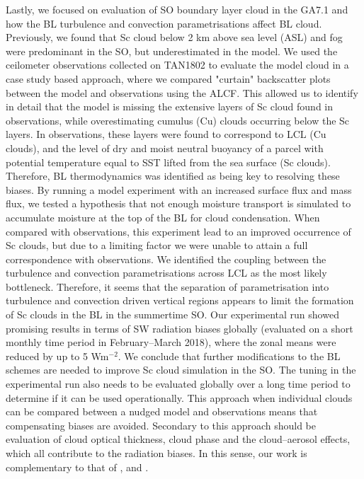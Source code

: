 Lastly, we focused on evaluation of SO boundary layer cloud in the GA7.1
and how the BL turbulence and convection parametrisations affect
BL cloud. Previously, we found that Sc cloud below 2 km above sea level (ASL)
and fog were predominant in the SO, but underestimated in the model. We used
the ceilometer observations collected on TAN1802 to evaluate the model cloud
in a case study based approach, where we compared "curtain" backscatter plots
between the model and observations using the ALCF. This allowed us to identify
in detail that the model is missing the extensive layers of Sc cloud found
in observations, while overestimating cumulus (Cu) clouds occurring below the
Sc layers. In observations, these layers were found to correspond to LCL (Cu clouds),
and the level of dry and moist neutral buoyancy of a parcel with potential temperature
equal to SST lifted from the sea surface (Sc clouds). Therefore, BL
thermodynamics was identified as being key to resolving these biases. By running
a model experiment with an increased surface flux and mass flux, we tested
a hypothesis that not enough moisture transport is simulated to accumulate
moisture at the top of the BL for cloud condensation. When compared with
observations, this experiment lead to an improved occurrence of Sc clouds,
but due to a limiting factor we were unable to attain a full correspondence
with observations. We identified the coupling between the turbulence and convection
parametrisations across LCL as the most likely bottleneck. Therefore, it seems
that the separation of parametrisation into turbulence and convection driven
vertical regions appears to limit the formation of Sc clouds in the BL in the
summertime SO. Our experimental run showed promising results in terms of
SW radiation biases globally (evaluated on a short monthly time period in February--March 2018),
where the zonal means were reduced by up to 5 Wm$^{-2}$. We conclude that
further modifications to the BL schemes are needed to improve
Sc cloud simulation in the SO. The tuning in the experimental run also needs to
be evaluated globally over a long time period to determine if it can be used
operationally. This approach when individual clouds can be compared between
a nudged model and observations means that compensating biases are avoided.
Secondary to this approach should be evaluation of cloud optical thickness,
cloud phase and the cloud--aerosol effects, which all contribute to the
radiation biases. In this sense, our work is complementary to that of
\cite{revell2019}, \cite{hartery2020a} and \cite{hartery2020b}.

